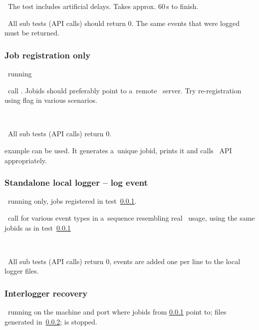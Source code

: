 \note\ The test includes artificial delays. Takes approx. 60\,s to finish.

\result\ All sub tests (API calls) should return 0. The same events that were logged must be returned.


\subsubsection{Job registration only}
\label{reg}
\req\ running 

\what\ call . Jobids should preferably point
to a~remote \LB\ server. Try re-registration using flag  in various scenarios.

\how\ 

\result\ All sub tests (API calls) return 0.

\begin{hints}
 example can be used. It generates a~unique jobid,
prints it and calls \LB\ API appropriately.
\end{hints}



\subsubsection{Standalone local logger -- log event}
\label{log}

\req\ running  only, jobs registered in test~\ref{reg}.

\what\ call  for various event types in a~sequence
resembling real \LB\ usage, using the same jobids as in test~\ref{reg}

\how\ 

\result\ All sub tests (API calls) return 0, events are added one per line to the local logger files.



\subsubsection{Interlogger recovery}
\label{recover}

\req\ running  on the machine and port where
jobids from \ref{reg} point to; files generated in~\ref{log};
 is stopped.

